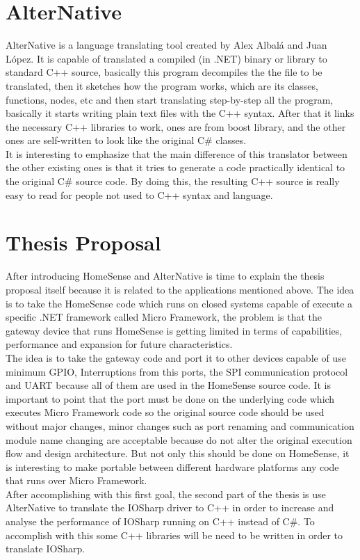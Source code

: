 \section{AlterNative}\label{S:Proposal-AlterNative}
AlterNative is a language translating tool created by Alex Albal\'{a} and Juan L\'{o}pez. It is capable of translated a compiled (in .NET) binary or library to standard C++ source, basically this program decompiles the the file to be translated, then it sketches how the program works, which are its classes, functions, nodes, etc and then start translating step-by-step all the program, basically it starts writing plain text files with the C++ syntax. After that it links the necessary C++ libraries to work, ones are from boost library, and the other ones are self-written to look like the original C\# classes.
\\
It is interesting to emphasize that the main difference of this translator between the other existing ones is that it tries to generate a code practically identical to the original C\# source code. By doing this, the resulting C++ source is really easy to read for people not used to C++ syntax and language.

\section{Thesis Proposal}\label{S:Proposal-Thesis-Proposal}
After introducing HomeSense and AlterNative is time to explain the thesis proposal itself because it is related to the applications mentioned above. The idea is to take the HomeSense code which runs on closed systems capable of execute a specific .NET framework called Micro Framework, the problem is that the gateway device that runs HomeSense is getting limited in terms of capabilities, performance and expansion for future characteristics.
\\
The idea is to take the gateway code and port it to other devices capable of use minimum GPIO, Interruptions from this ports, the SPI communication protocol and UART because all of them are used in the HomeSense source code. It is important to point that the port must be done on the underlying code which executes Micro Framework code so the original source code should be used without major changes, minor changes such as port renaming and communication module name changing are acceptable because do not alter the original execution flow and design architecture. But not only this should be done on HomeSense, it is interesting to make portable between different hardware platforms any code that runs over Micro Framework.
\\
After accomplishing with this first goal, the second part of the thesis is use AlterNative to translate the IOSharp driver to C++ in order to increase and analyse the performance of IOSharp running on C++ instead of C\#. To accomplish with this some C++ libraries will be need to be written in order to translate IOSharp.